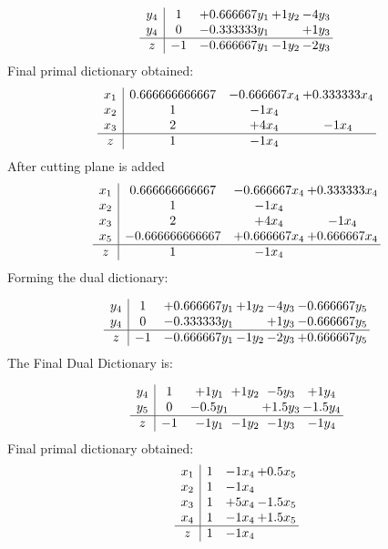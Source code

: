 \documentclass[11pt]{article}
\begin{document}
\[\begin{array}{c| c c@{\hskip 2pt} c@{\hskip 2pt} c@{\hskip 2pt} }
 y_{4}   &  1 & + 0.666667 y_{1} & + 1 y_{2} & -4 y_{3}\\
 y_{4}   &  0 & -0.333333 y_{1} &   & + 1 y_{3}\\
\hline
z    &  -1 & -0.666667 y_{1} & -1 y_{2} & -2 y_{3}\\
\end{array}\]
 Final primal dictionary obtained: 
\[\begin{array}{c| c c@{\hskip 2pt} c@{\hskip 2pt} }
 x_{1}   &  0.666666666667 & -0.666667 x_{4} & + 0.333333 x_{4}\\
 x_{2}   &  1 & -1 x_{4} &   \\
 x_{3}   &  2 & + 4 x_{4} & -1 x_{4}\\
\hline
z    &  1 & -1 x_{4} &   \\
\end{array}\]
 After cutting plane is added 
\[\begin{array}{c| c c@{\hskip 2pt} c@{\hskip 2pt} }
 x_{1}   &  0.666666666667 & -0.666667 x_{4} & + 0.333333 x_{4}\\
 x_{2}   &  1 & -1 x_{4} &   \\
 x_{3}   &  2 & + 4 x_{4} & -1 x_{4}\\
 x_{5}   &  -0.666666666667 & + 0.666667 x_{4} & + 0.666667 x_{4}\\
\hline
z    &  1 & -1 x_{4} &   \\
\end{array}\]
Forming the dual dictionary:

\[\begin{array}{c| c c@{\hskip 2pt} c@{\hskip 2pt} c@{\hskip 2pt} c@{\hskip 2pt} }
 y_{4}   &  1 & + 0.666667 y_{1} & + 1 y_{2} & -4 y_{3} & -0.666667 y_{5}\\
 y_{4}   &  0 & -0.333333 y_{1} &   & + 1 y_{3} & -0.666667 y_{5}\\
\hline
z    &  -1 & -0.666667 y_{1} & -1 y_{2} & -2 y_{3} & + 0.666667 y_{5}\\
\end{array}\]
The Final Dual Dictionary is: 

\[\begin{array}{c| c c@{\hskip 2pt} c@{\hskip 2pt} c@{\hskip 2pt} c@{\hskip 2pt} }
 y_{4}   &  1 & + 1 y_{1} & + 1 y_{2} & -5 y_{3} & + 1 y_{4}\\
 y_{5}   &  0 & -0.5 y_{1} &   & + 1.5 y_{3} & -1.5 y_{4}\\
\hline
z    &  -1 & -1 y_{1} & -1 y_{2} & -1 y_{3} & -1 y_{4}\\
\end{array}\]
 Final primal dictionary obtained: 
\[\begin{array}{c| c c@{\hskip 2pt} c@{\hskip 2pt} }
 x_{1}   &  1 & -1 x_{4} & + 0.5 x_{5}\\
 x_{2}   &  1 & -1 x_{4} &   \\
 x_{3}   &  1 & + 5 x_{4} & -1.5 x_{5}\\
 x_{4}   &  1 & -1 x_{4} & + 1.5 x_{5}\\
\hline
z    &  1 & -1 x_{4} &   \\
\end{array}\]
\end{document}
